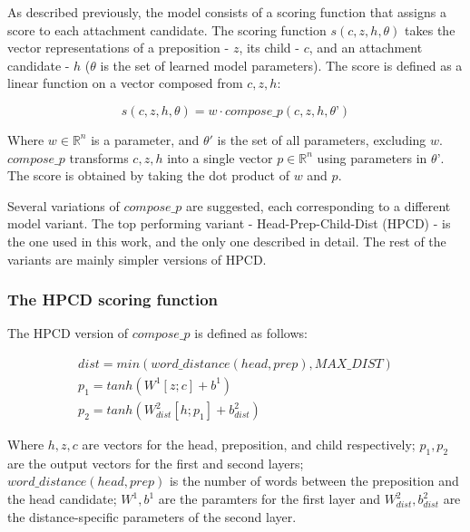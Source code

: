 As described previously, the model consists of a scoring function that assigns a score to each attachment candidate. The scoring function $s(c, z, h, \theta)$ takes the vector representations of a preposition  - $z$, its child - $c$, and an attachment candidate - $h$ ($\theta$ is the set of learned model parameters). The score is defined as a linear function on a vector composed from $c, z, h$:

$$s(c,z,h,\theta) = w \cdot compose\_p(c,z,h, \theta’)$$

Where $w \in \mathbb{R}^n$ is a parameter, and $\theta'$ is the set of all parameters, excluding $w$. $compose\_p$ transforms $c, z, h$ into a single vector $p \in \mathbb{R}^n$ using parameters in $\theta’$.  The score is obtained by taking the dot product of $w$ and $p$. 

Several variations of $compose\_p$ are suggested, each corresponding to a different model variant. The top performing variant - Head-Prep-Child-Dist (HPCD) - is the one used in this work, and the only one described in detail. The rest of the variants are mainly simpler versions of HPCD.

\tocless\subsubsection{The HPCD scoring function}

The HPCD version of $compose\_p$ is defined as follows:

\begin{equation}
\begin{gathered}  
   dist = min(word\_distance(head, prep), MAX\_DIST)  \\
   p_1 = tanh(W^1[z;c] + b^1)   \\
   p_2 = tanh(W^2_{dist}[h;p_1] + b^2_{dist})     
\end{gathered}\label{eq:hpcd}
\end{equation}

Where $h, z, c$ are vectors for the head, preposition, and child respectively; $p_1, p_2$ are the output vectors for the first and second layers;
$word\_distance(head, prep)$ is the number of words between the preposition and the head candidate; $ W^1, b^1$ are the paramters for the first layer and $W^2_{dist}, b^2_{dist}$ are the distance-specific parameters of the second layer.

